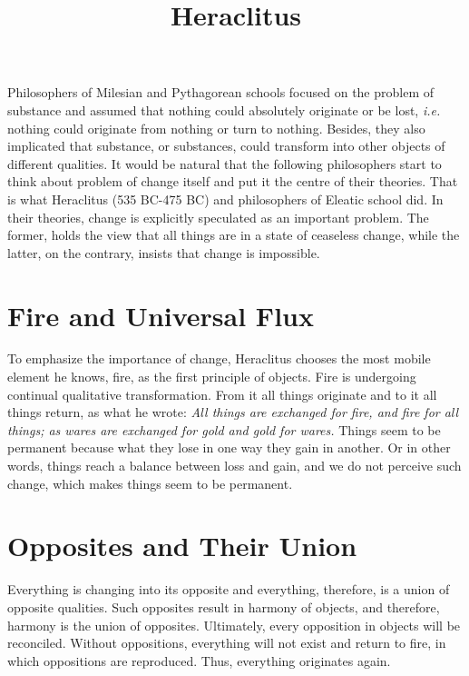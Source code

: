 \documentclass[11pt]{article}
\title{Heraclitus}
\date{}
\begin{document}
\begin{sloppypar}
  \maketitle

  \linenumbers
Philosophers of Milesian and Pythagorean schools focused on the problem of substance and assumed that nothing could absolutely originate or be lost, \textit{i.e.} nothing could originate from nothing or turn to nothing. 
Besides, they also implicated that substance, or substances, could transform into other objects of different qualities. 
It would be natural that the following philosophers start to think about problem of change itself and put it the centre of their theories. 
That is what Heraclitus (535 BC-475 BC) and philosophers of Eleatic school did. 
In their theories, change is explicitly speculated as an important problem. 
The former, holds the view that all things are in a state of ceaseless change, while the latter, on the contrary, insists that change is impossible. 

\section{Fire and Universal Flux}
To emphasize the importance of change, Heraclitus chooses the most mobile element he knows, fire, as the first principle of objects. 
Fire is undergoing continual qualitative transformation. 
From it all things originate and to it all things return, as what he wrote:
\newline
\textit{All things are exchanged for fire, and fire for all things; as wares are exchanged for gold and gold for wares.}
\newline
Things seem to be permanent because what they lose in one way they gain in another. 
Or in other words, things reach a balance between loss and gain, and we do not perceive such change, which makes things seem to be permanent.

\section{Opposites and Their Union}
Everything is changing into its opposite and everything, therefore, is a union of opposite qualities. 
Such opposites result in harmony of objects, and therefore, harmony is the union of opposites. 
Ultimately, every opposition in objects will be reconciled. 
Without oppositions, everything will not exist and return to fire, in which oppositions are reproduced. 
Thus, everything originates again.


\end{sloppypar}
\end{document}
